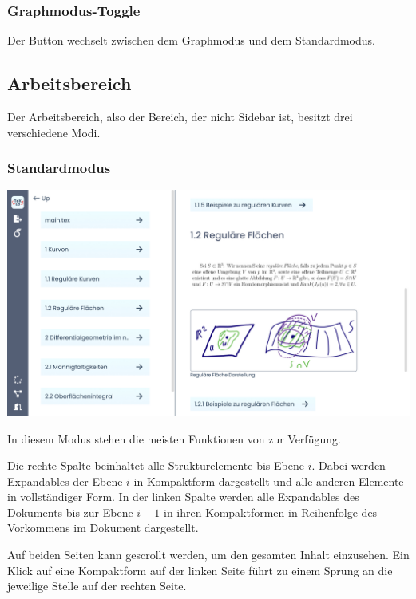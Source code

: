 \subsubsection{Graphmodus-Toggle}
Der Button wechselt zwischen dem Graphmodus und dem Standardmodus.

\subsection{Arbeitsbereich}
\label{subsec:arbeitsbereich}
Der Arbeitsbereich, also der Bereich, der nicht Sidebar ist, besitzt drei verschiedene Modi.

\subsubsection{Standardmodus}
\begin{minipage}
{\linewidth}

\includegraphics[width=\textwidth]{assets/img/Standardansicht}

\end{minipage}
In diesem Modus stehen die meisten Funktionen von \texla{} zur Verfügung.

Die rechte Spalte beinhaltet alle Strukturelemente bis Ebene $i$.
Dabei werden Expandables der Ebene $i$ in Kompaktform dargestellt und alle anderen Elemente in vollständiger Form.
In der linken Spalte werden alle Expandables des Dokuments bis zur Ebene $i-1$ in ihren Kompaktformen in
Reihenfolge des Vorkommens im Dokument dargestellt.

Auf beiden Seiten kann gescrollt werden, um den gesamten Inhalt einzusehen.
Ein Klick auf eine Kompaktform auf der linken Seite führt zu einem Sprung an die jeweilige Stelle auf der rechten Seite.

